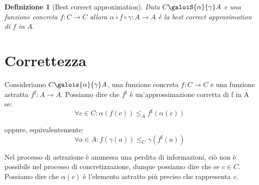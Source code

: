 \documentclass[a4paper, 10pt]{book}
\newtheorem{definit}{Definizione}[subsection]
\begin{document}
	\begin{definit}[Best correct approximation]
		Data $C \galoiS{\alpha}{\gamma} A$ e una funzione concreta $f : C \to C$ allora $\alpha \circ f \circ \gamma : A \to A$ è la best correct approximation di $f$ in $A$.
	\end{definit}
	
	\section{Correttezza}
	Consideriamo $C \galois{\alpha}{\gamma} A$, una funzione concreta $f: C\rightarrow C$ e una funzione astratta $f^{\sharp}: A\rightarrow A$. Possiamo dire che $f^{\sharp}$ è un'approssimazione corretta di f in A se:
	\begin{equation*}
	\forall c\in C: \alpha(f(c))\leq_A f^{\sharp}(\alpha(c))
	\end{equation*}
	
	\noindent
	oppure, equivalentemente:
	\begin{equation*}
	\forall a\in A: f(\gamma(a))\leq_C \gamma(f^{\sharp}(a))
	\end{equation*}
	
	Nel processo di astrazione è ammessa una perdita di informazioni, ciò non è possibile nel processo di concretizzazione, dunque possiamo dire che se $c\in C$. Possiamo  dire che $\alpha(c)$ è l'elemento astratto più preciso che rappresenta \textit{c}.
	
\end{document}
